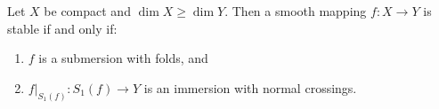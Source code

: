 Let $X$ be compact and $\dim X \geq \dim Y$. Then a smooth mapping $f: X \to Y$ is stable if and only if:
\begin{enumerate}
\item $f$ is a submersion with folds, and
\item $f|_{S_1(f)}: S_1(f) \to Y$ is an immersion with normal crossings.
\end{enumerate}

